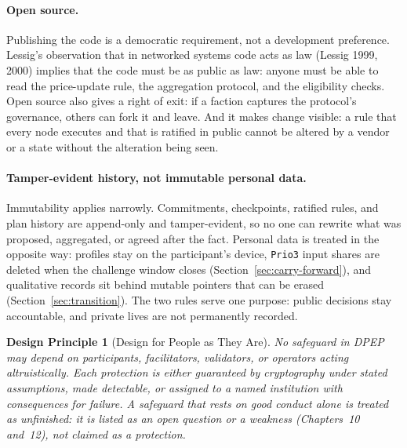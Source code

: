 \documentclass[10pt,twoside,openany]{book}
\theoremstyle{dpepstyle}
\newtheorem{designrule}{Design Principle}[chapter]
\begin{document}
\paragraph{Open source.} Publishing the code is a democratic requirement, not a development preference. Lessig's observation that in networked systems code acts as law (Lessig 1999, 2000) implies that the code must be as public as law: anyone must be able to read the price-update rule, the aggregation protocol, and the eligibility checks. Open source also gives a right of exit: if a faction captures the protocol's governance, others can fork it and leave. And it makes change visible: a rule that every node executes and that is ratified in public cannot be altered by a vendor or a state without the alteration being seen.

\paragraph{Tamper-evident history, not immutable personal data.} Immutability applies narrowly. Commitments, checkpoints, ratified rules, and plan history are append-only and tamper-evident, so no one can rewrite what was proposed, aggregated, or agreed after the fact. Personal data is treated in the opposite way: profiles stay on the participant's device, \texttt{Prio3} input shares are deleted when the challenge window closes (Section~\ref{sec:carry-forward}), and qualitative records sit behind mutable pointers that can be erased (Section~\ref{sec:transition}). The two rules serve one purpose: public decisions stay accountable, and private lives are not permanently recorded.

\begin{designrule}[Design for People as They Are]
No safeguard in DPEP may depend on participants, facilitators, validators, or operators acting altruistically. Each protection is either guaranteed by cryptography under stated assumptions, made detectable, or assigned to a named institution with consequences for failure. A safeguard that rests on good conduct alone is treated as unfinished: it is listed as an open question or a weakness (Chapters~10 and~12), not claimed as a protection.
\end{designrule}
\end{document}
